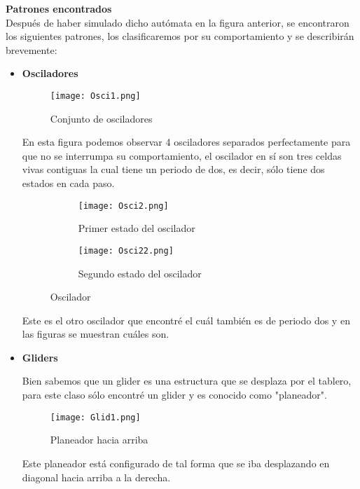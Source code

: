 \documentclass{article}
\begin{document}
	\textbf{Patrones encontrados}
	\\
	Después de haber simulado dicho autómata en la figura anterior, se encontraron los siguientes patrones, los clasificaremos por su comportamiento y se describirán brevemente:
	
	\begin{itemize}
		\item \textbf{Osciladores}
		\vspace{46pt}
			\begin{figure}[htbp]
			\centering       
			\texttt{[image: Osci1.png]}
			\caption{Conjunto de osciladores}
			\label{fig:O1} 
		\end{figure}
		
		En esta figura podemos observar 4 osciladores separados perfectamente para que no se interrumpa su comportamiento, el oscilador en sí son tres celdas vivas contiguas la cual tiene un periodo de dos, es decir, sólo tiene dos estados en cada paso. 
		
	\begin{figure}[htbp]
		\centering
		\begin{subfigure}{0.48\textwidth}
		    \centering
			\texttt{[image: Osci2.png]}
			\caption{Primer estado del oscilador}
			\label{fig:imagen1}
		\end{subfigure}
		\hfill
		\begin{subfigure}{0.48\textwidth}
			\centering
			\texttt{[image: Osci22.png]}
			\caption{Segundo estado del oscilador}
			\label{fig:imagen2}
		\end{subfigure}
		\caption{Oscilador}
		\label{fig:conjunto_osciladores}
	\end{figure}
	
	Este es el otro oscilador que encontré el cuál también es de periodo dos y en las figuras se muestran cuáles son. 
		
		\item \textbf{Gliders}
	
	Bien sabemos que un glider es una estructura que se desplaza por el tablero, para este claso sólo encontré un glider y es conocido como "planeador".
	
		\begin{figure}[htbp]
			\centering       
			\texttt{[image: Glid1.png]}
			\caption{Planeador hacia arriba}
			\label{fig:G1} 
		\end{figure}
	
	Este planeador está configurado de tal forma que se iba desplazando en diagonal hacia arriba a la derecha.
	

\end{itemize}
\end{document}

